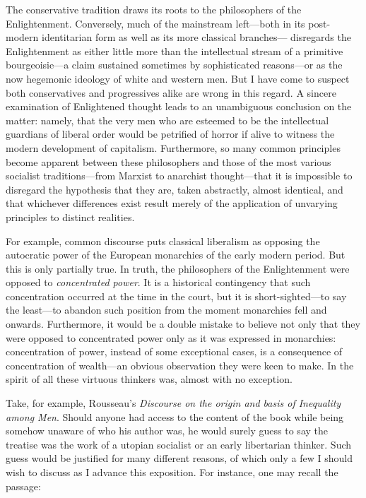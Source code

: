 \documentclass[a4paper]{article}
\begin{document}
The conservative tradition draws its roots to the philosophers of
the Enlightenment. Conversely, much of the mainstream left---both in its
post-modern identitarian form as well as its more classical branches---
disregards the Enlightenment as either little more than the intellectual
stream of a primitive bourgeoisie---a claim sustained sometimes by sophisticated
reasons---or as the now hegemonic ideology of white and western men. But I have
come to suspect both conservatives and progressives alike are wrong in this
regard. A sincere examination of Enlightened thought leads to an unambiguous
conclusion on the matter: namely, that the very men who are esteemed to be the
intellectual guardians of liberal order would be petrified of horror if alive to
witness the modern development of capitalism. Furthermore, so many common
principles become apparent between these philosophers and those of the most
various socialist traditions---from Marxist to anarchist thought---that it is
impossible to disregard the hypothesis that they are, taken abstractly, almost
identical, and that whichever differences exist result merely of the application
of unvarying principles to distinct realities.



For example, common discourse puts classical liberalism as opposing the
autocratic power of the European monarchies of the early modern period. But this
is only partially true. In truth, the philosophers of the Enlightenment were
opposed to \textit{concentrated power}. It is a historical contingency that such
concentration occurred at the time in the court, but it is short-sighted---to
say the least---to abandon such position from the moment monarchies fell and
onwards. Furthermore, it would be a double mistake to believe not only that they
were opposed to concentrated power only as it was expressed in monarchies:
concentration of power, instead of some exceptional cases, is a consequence of
concentration of wealth---an obvious observation they were keen to make. In the
spirit of all these virtuous thinkers was, almost with no exception.

Take, for example, Rousseau's \textit{Discourse on the origin and basis of
Inequality among Men}. Should anyone had access to the content of the book while
being somehow unaware of who his author was, he would surely guess to say the treatise
was the work of a utopian socialist or an early libertarian thinker. Such guess
would be justified for many different reasons, of which only a few I should wish
to discuss as I advance this exposition. For instance, one may recall the
passage:
\end{document}
